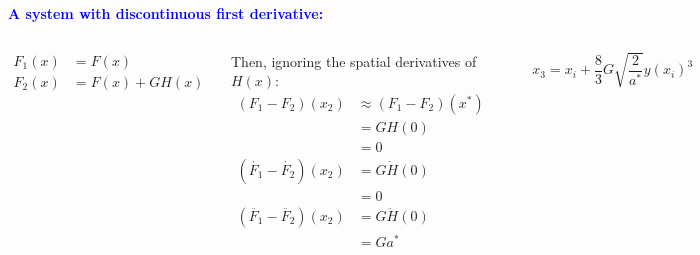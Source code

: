 \documentclass[xcolor=x11names,compress]{beamer}
\renewcommand{\(}{\begin{columns}}
\renewcommand{\)}{\end{columns}}
\newcommand{\<}[1]{\begin{column}{#1}}
\renewcommand{\>}{\end{column}}
\newcommand{\hlb}[1]{\textbf{\textcolor{blue}{#1}}}
\begin{document}
\begin{frame}
\hlb{A system with discontinuous first derivative:}
\begin{columns}[c]
\begin{align}
\label{}
F_1(x)&=F(x)\\
F_2(x)&=F(x)+GH(x)
\end{align}

Then, ignoring the spatial derivatives of $H(x)$:
\begin{align*}
(F_1-F_2)(x_2)&\approx (F_1-F_2)(x^*)\\
&=GH(0)\\
&=0\\
(\dot{F_1}-\dot{F_2})(x_2)&=G\dot{H}(0)\\
&=0\\
(\ddot{F_1}-\ddot{F_2})(x_2)&=G\ddot{H}(0)\\
&=Ga^*
\end{align*}
\begin{center}
\includegraphics[width=\textwidth]{ZDM_eval}
\end{center}

\[
x_3=x_i+\frac{8}{3}G\sqrt{\frac{2}{a^*}}y(x_i)^3
\]


\end{columns}
\end{frame}
\end{document}
